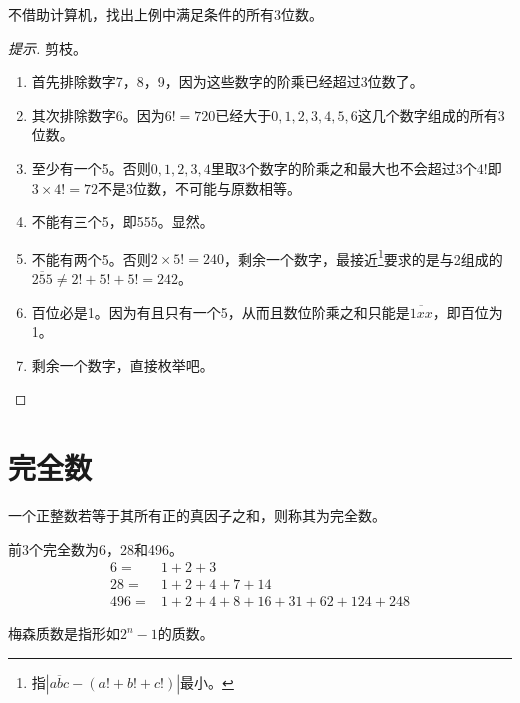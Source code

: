 \begin{question}[莫斯科，1940]
  不借助计算机，找出上例中满足条件的所有3位数。
\end{question}
\begin{proof}[提示]
  剪枝。
  \begin{enumerate}
  \item 首先排除数字7，8，9，因为这些数字的阶乘已经超过3位数了。

  \item 其次排除数字6。因为$6!=720$已经大于$0,1,2,3,4,5,6$这几个数字组成的所有3位数。

  \item 至少有一个5。否则$0,1,2,3,4$里取3个数字的阶乘之和最大也不会超过3个$4!$即$3\times 4!=72$不是3位数，不可能与原数相等。

  \item 不能有三个5，即555。显然。

  \item 不能有两个5。否则$2\times 5!=240$，剩余一个数字，最接近\footnote{指$|\overline{abc}-(a!+b!+c!)|$最小。}要求的是与2组成的$\overline{255}\ne 2!+5!+5!=242$。

  \item 百位必是1。因为有且只有一个5，从而且数位阶乘之和只能是$\overline{1xx}$，即百位为1。
    
  \item 剩余一个数字，直接枚举吧。\qedhere
  \end{enumerate}
\end{proof}


\section{完全数}
\label{sec:perfect-number}

\begin{definition}
  一个正整数若等于其所有正的真因子之和，则称其为完全数。
\end{definition}
前3个完全数为6，28和496。
\begin{align*}
  6   ={} & 1 + 2 + 3\\
  28  ={} & 1 + 2 + 4 + 7 + 14\\
  496 ={} & 1 + 2 + 4 + 8 + 16 + 31 + 62 + 124 + 248
\end{align*}

\begin{definition}
  梅森质数是指形如$2^n - 1$的质数。
\end{definition}


